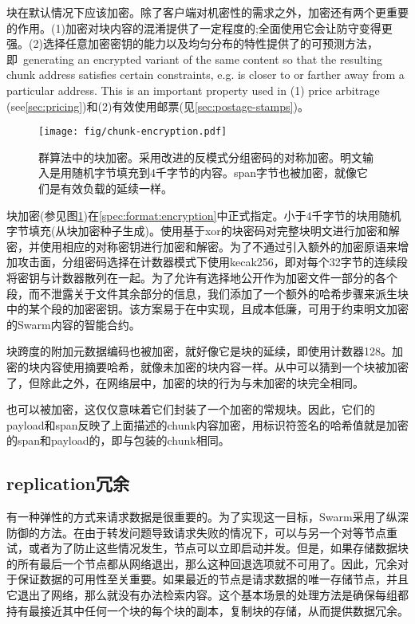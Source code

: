 块在默认情况下应该加密。除了客户端对机密性的需求之外，加密还有两个更重要的作用。(1)加密对块内容的混淆提供了一定程度的;全面使用它会让防守变得更强。(2)选择任意加密密钥的能力以及均匀分布的特性提供了的可预测方法，即\ generating an encrypted variant of the same content so that the resulting chunk address satisfies certain constraints, e.g. is closer to or farther away from a particular address. This is an important property used in (1) price arbitrage (see\ref{sec:pricing})和(2)有效使用邮票(见\ref{sec:postage-stamps})。


\begin{figure}[htbp]
    \centering
    \texttt{[image: fig/chunk-encryption.pdf]}
    \caption[群中的块加密\statusgreen]{群算法中的块加密。采用改进的反模式分组密码的对称加密。明文输入是用随机字节填充到4千字节的内容。span字节也被加密，就像它们是有效负载的延续一样。}
    \label{fig:chunk-encryption}
\end{figure}


块加密(参见图\ref{fig:chunk-encryption})在\ref{spec:format:encryption}中正式指定。小于4千字节的块用随机字节填充(从块加密种子生成)。使用基于xor的块密码对完整块明文进行加密和解密，并使用相应的对称密钥进行加密和解密。为了不通过引入额外的加密原语来增加攻击面，分组密码选择在计数器模式下使用kecak256，即对每个32字节的连续段将密钥与计数器散列在一起。为了允许有选择地公开作为加密文件一部分的各个段，而不泄露关于文件其余部分的信息，我们添加了一个额外的哈希步骤来派生块中的某个段的加密密钥。该方案易于在中实现，且成本低廉，可用于约束明文加密的Swarm内容的智能合约。

块跨度的附加元数据编码也被加密，就好像它是块的延续，即使用计数器128。加密的块内容使用摘要哈希，就像未加密的块内容一样。从中可以猜到一个块被加密了，但除此之外，在网络层中，加密的块的行为与未加密的块完全相同。

也可以被加密，这仅仅意味着它们封装了一个加密的常规块。因此，它们的payload和span反映了上面描述的chunk内容加密，用标识符签名的哈希值就是加密的span和payload的，即与包装的chunk相同。

\subsection{replication冗余\statusgreen}\label{sec:redundancy-by-local-replication}

有一种弹性的方式来请求数据是很重要的。为了实现这一目标，Swarm采用了纵深防御的方法。在由于转发问题导致请求失败的情况下，可以与另一个对等节点重试，或者为了防止这些情况发生，节点可以立即启动并发。但是，如果存储数据块的所有最后一个节点都从网络退出，那么这种回退选项就不可用了。因此，冗余对于保证数据的可用性至关重要。如果最近的节点是请求数据的唯一存储节点，并且它退出了网络，那么就没有办法检索内容。这个基本场景的处理方法是确保每组都持有最接近其中任何一个块的每个块的副本，复制块的存储，从而提供数据冗余。 

